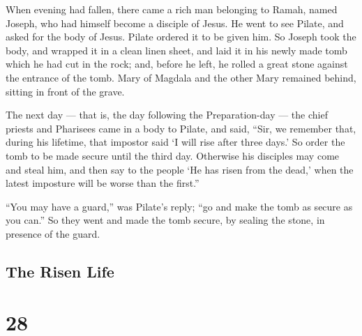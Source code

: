  When evening had fallen, there came a rich man belonging
to Ramah, named Joseph, who had himself become a disciple of Jesus.
 He went to see Pilate, and asked for the body of Jesus.
Pilate ordered it to be given him.  So Joseph took the
body, and wrapped it in a clean linen sheet,  and laid it
in his newly made tomb which he had cut in the rock; and, before he
left, he rolled a great stone against the entrance of the tomb.
 Mary of Magdala and the other Mary remained behind,
sitting in front of the grave.

 The next day --- that is, the day following the
Preparation-day --- the chief priests and Pharisees came in a body to
Pilate, and said,  ``Sir, we remember that, during his
lifetime, that impostor said `I will rise after three days.'
 So order the tomb to be made secure until the third day.
Otherwise his disciples may come and steal him, and then say to the
people `He has risen from the dead,' when the latest imposture will be
worse than the first.''

 ``You may have a guard,'' was Pilate's reply; ``go and
make the tomb as secure as you can.''  So they went and
made the tomb secure, by sealing the stone, in presence of the guard.

\hypertarget{the-risen-life}{%
\subsection{The Risen Life}\label{the-risen-life}}

\hypertarget{section-27}{%
\section{28}\label{section-27}}

